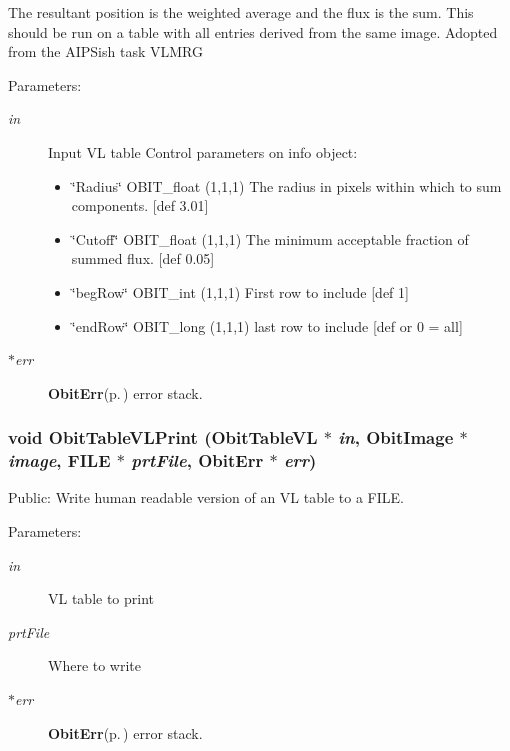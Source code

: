 The resultant position is the weighted average and the flux is the sum. This should be run on a table with all entries derived from the same image. Adopted from the AIPSish task VLMRG \begin{Desc}
\item[Parameters:]
\begin{description}
\item[{\em in}]Input VL table Control parameters on info object: \begin{itemize}
\item \char`\"{}Radius\char`\"{} OBIT\_\-float (1,1,1) The radius in pixels within which to sum components. [def 3.01] \item \char`\"{}Cutoff\char`\"{} OBIT\_\-float (1,1,1) The minimum acceptable fraction of summed flux. [def 0.05] \item \char`\"{}beg\-Row\char`\"{} OBIT\_\-int (1,1,1) First row to include [def 1] \item \char`\"{}end\-Row\char`\"{} OBIT\_\-long (1,1,1) last row to include [def or 0 = all] \end{itemize}
\item[{\em $\ast$err}]{\bf Obit\-Err}{\rm (p.\,\pageref{structObitErr})} error stack. \end{description}
\end{Desc}
\subsubsection{\setlength{\rightskip}{0pt plus 5cm}void Obit\-Table\-VLPrint ({\bf Obit\-Table\-VL} $\ast$ {\em in}, {\bf Obit\-Image} $\ast$ {\em image}, FILE $\ast$ {\em prt\-File}, {\bf Obit\-Err} $\ast$ {\em err})}\label{ObitTableVLUtil_8c_a7}


Public: Write human readable version of an VL table to a FILE. 

\begin{Desc}
\item[Parameters:]
\begin{description}
\item[{\em in}]VL table to print \item[{\em prt\-File}]Where to write \item[{\em $\ast$err}]{\bf Obit\-Err}{\rm (p.\,\pageref{structObitErr})} error stack. \end{description}
\end{Desc}
